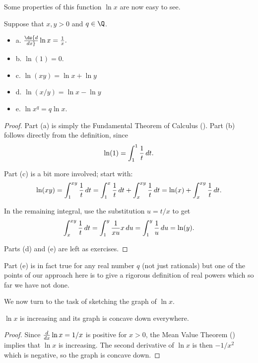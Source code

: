 Some properties of this function $\ln x$ are now easy to see.

\begin{theorem} Suppose that $x,y >0 $ and $q\in \Q$.
\label{thm:log rules}
\begin{itemize} %
\item{a.} $\ds{d\over dx} \ln x = {1\over x}.$
\item{b.} $\ln(1) = 0$.
\item{c.} $\ln (xy) = \ln x+ \ln y $
\item{d.} $\ln(x/y) = \ln x - \ln y $
\item{e.} $\ln x^q  = q\ln x $.
\end{itemize}

\begin{proof} Part (a) is simply the Fundamental Theorem of Calculus
(). Part (b) follows directly from
the definition, since 
$$\ln(1)=\int_1^1 {1\over t}\,dt.$$

Part (c) is a bit more involved; start with:
$$\ln(xy)=\int_1^{xy} {1\over t}\,dt=
\int_1^{x} {1\over t}\,dt+\int_x^{xy} {1\over t}\,dt
=\ln(x)+\int_x^{xy} {1\over t}\,dt.$$

In the remaining integral, use the substitution $u=t/x$ to get
$$\int_x^{xy} {1\over t}\,dt=\int_1^{y} {1\over xu}x\,du
=\int_1^{y} {1\over u}\,du=\ln(y).$$




Parts (d) and (e) are left as exercises.
\end{proof}

Part (e) is in fact true for any real number $q$
(not just rationals) but one of the points of our approach here is
to give a rigorous definition of real powers which so far we have
not done.

 We now turn to the task of sketching the graph of $\ln x$.

 \begin{theorem} $\ln x $ is increasing and 
its graph is concave down everywhere.

\begin{proof} Since ${d\over dx}\ln x =1/x$ is positive 
for $x>0$, the Mean Value Theorem () implies that $\ln x$
is increasing.
The second derivative of $\ln x$ is then $-1/x^2$ which is negative,
so the graph is concave down.
\end{proof}


\end{theorem}
\end{theorem}
